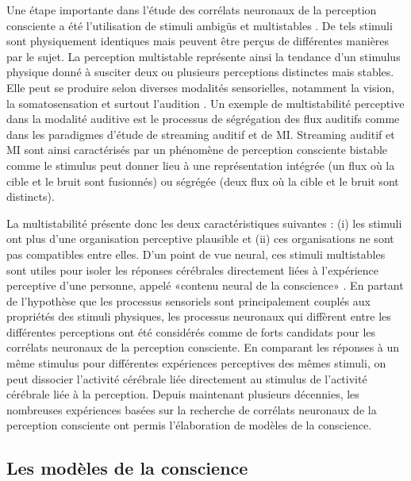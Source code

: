 Une étape importante dans l'étude des corrélats neuronaux de la perception consciente a été l'utilisation de stimuli ambigüs et multistables \citep{leopold1996activity}. 
De tels stimuli sont physiquement identiques mais peuvent être perçus de différentes manières par le sujet. 
La perception multistable représente ainsi la tendance d'un stimulus physique donné à susciter deux ou plusieurs perceptions distinctes mais stables. 
Elle peut se produire selon diverses modalités sensorielles, notamment la vision, la somatosensation et surtout l'audition \citep{dykstra2011neural}. 
Un exemple de multistabilité perceptive dans la modalité auditive est le processus de ségrégation des flux auditifs comme dans les paradigmes d'étude de streaming auditif et de MI. 
Streaming auditif et MI sont ainsi caractérisés par un phénomène de perception consciente bistable comme le stimulus peut donner lieu à une représentation intégrée (un flux où la cible et le bruit sont fusionnés) ou ségrégée (deux flux où la cible et le bruit sont distincts). 

La multistabilité présente donc les deux caractéristiques suivantes \citep{schwartz2012multistability} : (i) les stimuli ont plus d'une organisation perceptive plausible et (ii) ces organisations ne sont pas compatibles entre elles. 
D'un point de vue neural, ces stimuli multistables sont utiles pour isoler les réponses cérébrales directement liées à l'expérience perceptive d'une personne, appelé «contenu neural de la conscience» \citep{gazzaniga2009cognitive}. 
En partant de l'hypothèse que les processus sensoriels sont principalement couplés aux propriétés des stimuli physiques, les processus neuronaux qui diffèrent entre les différentes perceptions ont été considérés comme de forts candidats pour les corrélats neuronaux de la perception consciente. 
En comparant les réponses à un même stimulus pour différentes expériences perceptives des mêmes stimuli, on peut dissocier l'activité cérébrale liée directement au stimulus de l'activité cérébrale liée à la perception. 
Depuis maintenant plusieurs décennies, les nombreuses expériences basées sur la recherche de corrélats neuronaux de la perception consciente ont permis l'élaboration de modèles de la conscience. 

\subsection{Les modèles de la conscience}
\label{modelesconscience}

